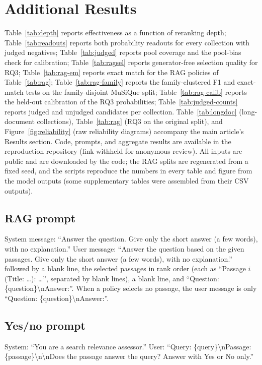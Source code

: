 \section{Additional Results}

Table~\ref{tab:depth} reports effectiveness as a function of reranking depth; Table~\ref{tab:readouts} reports both probability readouts for every collection with judged negatives; Table~\ref{tab:judged} reports pool coverage and the pool-bias check for calibration; Table~\ref{tab:ragsel} reports generator-free selection quality for RQ3; Table~\ref{tab:rag-em} reports exact match for the RAG policies of Table~\ref{tab:rag}; Table~\ref{tab:rag-family} reports the family-clustered F1 and exact-match tests on the family-disjoint MuSiQue split; Table~\ref{tab:rag-calib} reports the held-out calibration of the RQ3 probabilities; Table~\ref{tab:judged-counts} reports judged and unjudged candidates per collection. Table~\ref{tab:longdoc} (long-document collections), Table~\ref{tab:rag} (RQ3 on the original split), and Figure~\ref{fig:reliability} (raw reliability diagrams) accompany the main article's Results section.
Code, prompts, and aggregate results are available in the reproduction repository (link withheld for anonymous review). All inputs are public and are downloaded by the code; the RAG splits are regenerated from a fixed seed, and the scripts reproduce the numbers in every table and figure from the model outputs (some supplementary tables were assembled from their CSV outputs).









\subsection{RAG prompt}
System message: ``Answer the question. Give only the short answer (a few words), with no explanation.'' User message: ``Answer the question based on the given passages. Give only the short answer (a few words), with no explanation.'' followed by a blank line, the selected passages in rank order (each as ``Passage $i$ (Title: \dots): \dots'', separated by blank lines), a blank line, and ``Question: \{question\}\textbackslash nAnswer:''. When a policy selects no passage, the user message is only ``Question: \{question\}\textbackslash nAnswer:''.

\subsection{Yes/no prompt}
System: ``You are a search relevance assessor.'' User: ``Query: \{query\}\textbackslash nPassage: \{passage\}\textbackslash n\textbackslash nDoes the passage answer the query? Answer with Yes or No only.''

